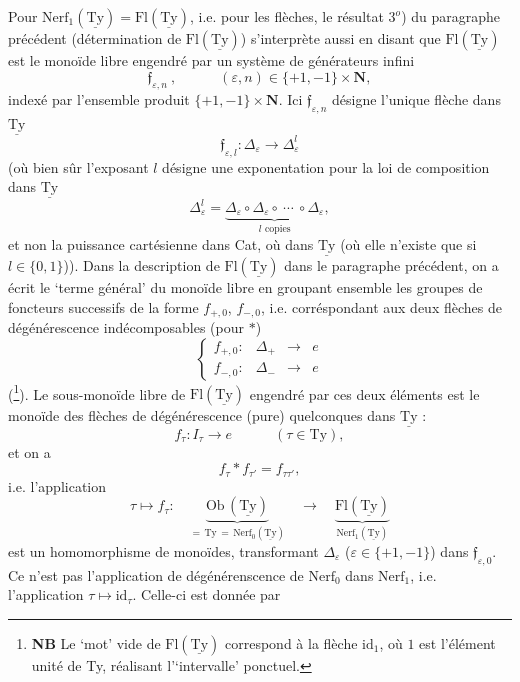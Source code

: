 \documentclass[11pt]{article}
\newcommand{\printedpage}[1]{\marginpar{\footnotesize p.~#1}}
\newcommand{\msp}[1]{\marginpar{\footnotesize [#1]}}
\newcommand{\uTy}{\underline{\mathrm{Ty}}}
\begin{document}
\msp{page 50$'$}
Pour $\mathrm{Nerf}_1(\uTy) = \mathrm{Fl}(\uTy)$, i.e. pour les flèches, le résultat $3^o$) du paragraphe précédent (détermination de $\mathrm{Fl}(\uTy)$) s'interprète aussi en disant que $\mathrm{Fl}(\uTy)$ est le monoïde libre engendré par un système de générateurs infini
\[
\mathfrak{f}_{\varepsilon,n}\ , \qquad\quad (\varepsilon,n)\in\{+1,-1\}\times\mathbf{N},
\]
indexé par l'ensemble produit $\{+1,-1\}\times\mathbf{N}$. Ici $\mathfrak{f}_{\varepsilon,n}$ désigne l'unique flèche dans $\uTy$
\[
\mathfrak{f}_{\varepsilon,l} : \Delta_\varepsilon \longrightarrow \Delta^l_\varepsilon
\]
(où bien sûr l'exposant $l$ désigne une exponentation pour la loi de composition dans $\uTy$
\[
\Delta^l_\varepsilon = \underbrace{\Delta_\varepsilon\circ\Delta_\varepsilon\circ\ \cdots\ \circ\Delta_\varepsilon}_{l\text{ copies}},
\]
et non la puissance cartésienne dans Cat, où dans $\uTy$ (où elle n'existe que si $l\in\{0,1\}$)). %
Dans la description de $\mathrm{Fl}(\uTy)$ dans le paragraphe précédent, on a écrit le `terme général' du monoïde libre en groupant ensemble les groupes de foncteurs successifs de la forme $f_{+,0}$, $f_{-,0}$, i.e. corréspondant aux deux flèches de dégénérescence indécomposables (pour $*$) %
\[
\left\{
\begin{array}{lccc}
f_{+,0} : & \Delta_+ & \longrightarrow & e\\[4pt]
f_{-,0} : & \Delta_- & \longrightarrow & e
\end{array}
\right.
\]
(\footnote[15]{\textbf{NB} Le `mot' vide de $\mathrm{Fl}(\uTy)$ correspond à la flèche $\mathrm{id}_1$, où $1$ est l'élément unité de Ty, réalisant l'`intervalle' ponctuel.}). Le sous-monoïde libre de $\mathrm{Fl}(\uTy)$ engendré par ces deux éléments est le monoïde des flèches de dégénérescence (pure) quelconques
\printedpage{35}
\msp{page 51}
dans $\uTy$ :
\[
f_\tau : I_\tau \longrightarrow e \qquad\quad (\tau\in\mathrm{Ty}),
\]
et on a
\[
f_\tau * f_{\tau'} = f_{\tau\tau'},
\]
i.e. l'application
\[
\tau \longmapsto f_\tau :\quad \underbrace{\mathrm{Ob}\,(\uTy)}_{=\,\mathrm{Ty}\,=\,\mathrm{Nerf}_0(\uTy)} \quad\longrightarrow\quad \underbrace{\mathrm{Fl}(\uTy)}_{\mathrm{Nerf}_1(\uTy)}
\]
est un homomorphisme de monoïdes, transformant $\Delta_\varepsilon$ ($\varepsilon\in\{+1,-1\}$) dans $\mathfrak{f}_{\varepsilon,0}$. Ce n'est pas l'application de dégénérenscence de $\mathrm{Nerf}_0$ dans $\mathrm{Nerf}_1$, i.e. l'application $\tau\longmapsto\mathrm{id}_\tau$. Celle-ci est donnée par %
\end{document}

